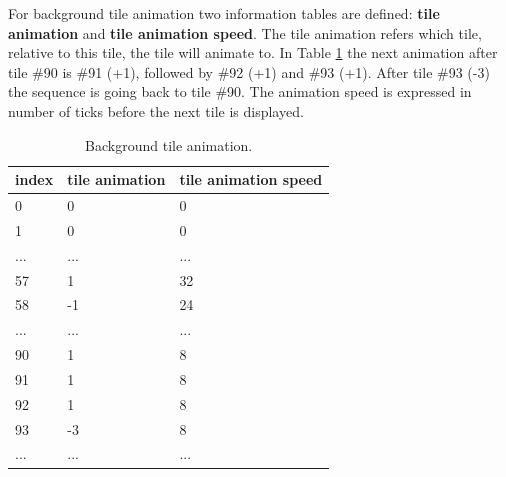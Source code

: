\documentclass[book.tex]{subfiles}
\begin{document}
For background tile animation two information tables are defined: \textbf{tile animation} and \textbf{tile animation speed}. The tile animation refers which tile, relative to this tile, the tile will animate to. In Table \ref{table:background tile anim} the next animation after tile \#90 is \#91 (+1), followed by \#92 (+1) and \#93 (+1). After tile \#93 (-3) the sequence is going back to tile \#90. The animation speed is expressed in number of ticks before the next tile is displayed. \\
 \begin{table}[H]
  \begin{tabularx}{\textwidth}[c]{XXX}
  \hline
  \textbf{index} & \textbf{tile animation} & \textbf{tile animation speed}   \\ \hline
  0             & 0          & 0    \\
  1             & 0          & 0    \\
  ...             & ...          & ...    \\
  57             & 1          & 32    \\
  58             & -1          & 24    \\
  ...             & ...          & ...    \\
  90             & 1          & 8    \\
  91            & 1          & 8    \\
  92             & 1          & 8    \\
  93             & -3          & 8    \\
  ...             & ...          & ...    \\
  \end{tabularx}
  \caption{Background tile animation.}
  \label{table:background tile anim}
  \end{table}
  
\end{document}

